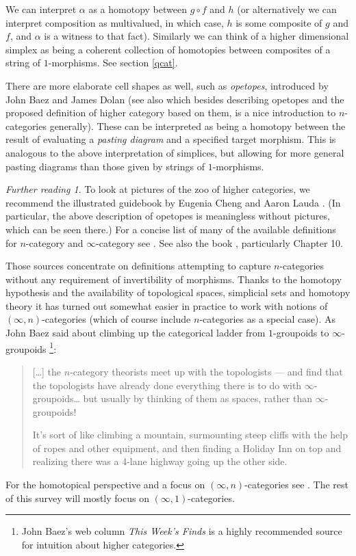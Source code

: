 \documentclass{conm-p-l}
\theoremstyle{definition} \newtheorem{definition}[theorem]{Definition}
\theoremstyle{remark} \newtheorem{remark}[theorem]{Remark}
\newtheorem*{further}{Further reading}
\numberwithin{equation}{section}
\newcommand{\oo}{\infty}
\newcommand{\io}{$(\oo,1)$}
\begin{document}
We can interpret $\alpha$ as a homotopy between $g\circ f$ and $h$ (or
alternatively we can interpret composition as multivalued, in which
case, $h$ is some composite of $g$ and $f$, and $\alpha$ is a witness
to that fact). Similarly we can think of a higher dimensional simplex
as being a coherent collection of homotopies between composites
of a string of $1$-morphisms. See section \ref{qcat}.

There are more elaborate cell shapes as well, such as \emph{opetopes},
introduced by John Baez and James Dolan \cite{BaezDolan3} (see also
\cite{BaezIntro} which besides describing opetopes and the proposed
definition of higher category based on them, is a nice introduction to
$n$-categories generally). These can be interpreted as being a
homotopy between the result of evaluating a \emph{pasting diagram} and
a specified target morphism. This is analogous to the above
interpretation of simplices, but allowing for more general pasting
diagrams than those given by strings of $1$-morphisms.

\begin{further}
  To look at pictures of the zoo of higher categories, we recommend
  the illustrated guidebook by Eugenia Cheng and Aaron Lauda
  \cite{ChengLauda}. (In particular, the above description of opetopes
  is meaningless without pictures, which can be seen there.)  For a
  concise list of many of the available definitions for $n$-category
  and $\oo$-category see \cite{LeinsterDef}. See also the book
  \cite{LeinsterBook}, particularly Chapter 10.

  Those sources concentrate on definitions attempting to capture
  $n$-categories without any requirement of invertibility of morphisms.
  Thanks to the homotopy hypothesis and the availability of topological
  spaces, simplicial sets and homotopy theory it has turned out somewhat
  easier in practice to work with notions of $(\oo,n)$-categories
  (which of course include $n$-categories as a special case). As John
  Baez said about climbing up the categorical ladder from $1$-groupoids
  to $\oo$-groupoids \cite{TWF223}\footnote{John Baez's web column
  \emph{This Week's Finds} is a highly recommended source for intuition
  about higher categories.}:

  \begin{quotation}
    [\dots] the $n$-category theorists meet up with the topologists ---
    and find that the topologists have already done everything there is
    to do with $\oo$-groupoids\dots{} but usually by thinking of them
    as spaces, rather than $\oo$-groupoids!

    It's sort of like climbing a mountain, surmounting steep cliffs with
    the help of ropes and other equipment, and then finding a Holiday
    Inn on top and realizing there was a 4-lane highway going up the
    other side.
  \end{quotation}

  For the homotopical perspective and a focus on $(\oo,n)$-categories
  see \cite{Simpson}. The rest of this survey will mostly focus on
  \io-categories.
\end{further}
\end{document}
